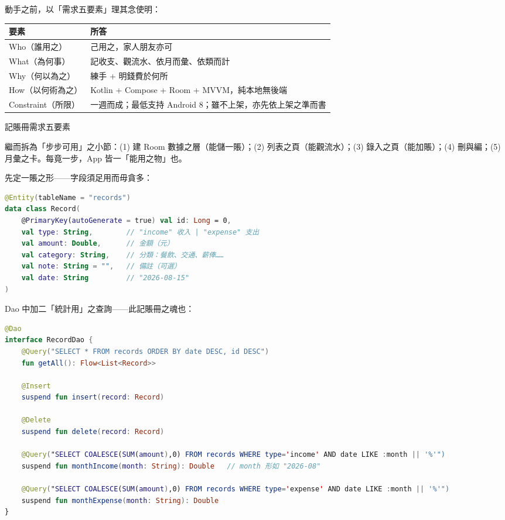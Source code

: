 


動手之前，以「需求五要素」理其念使明：

\begin{center}
\begin{tabularx}{\linewidth}{|X|X|}
\hline
\textbf{要素} & \textbf{所答} \tabularnewline
\hline
Who（誰用之） & 己用之，家人朋友亦可 \tabularnewline
What（為何事） & 記收支、觀流水、依月而彙、依類而計 \tabularnewline
Why（何以為之） & 練手 + 明錢費於何所 \tabularnewline
How（以何術為之） & Kotlin + Compose + Room + MVVM，純本地無後端 \tabularnewline
Constraint（所限） & 一週而成；最低支持 Android 8；雖不上架，亦先依上架之準而書 \tabularnewline
\hline
\end{tabularx}
\end{center}

\begin{center}\small\color{gray}記賬冊需求五要素\end{center}

繼而拆為「步步可用」之小節：(1) 建 Room 數據之層（能儲一賬）；(2) 列表之頁（能觀流水）；(3) 錄入之頁（能加賬）；(4) 刪與編；(5) 月彙之卡。每竟一步，App 皆一「能用之物」也。


先定一賬之形——字段須足用而毋貪多：

\begin{lstlisting}[language=Kotlin]
@Entity(tableName = "records")
data class Record(
    @PrimaryKey(autoGenerate = true) val id: Long = 0,
    val type: String,        // "income" 收入 | "expense" 支出
    val amount: Double,      // 金額（元）
    val category: String,    // 分類：餐飲、交通、薪俸……
    val note: String = "",   // 備註（可選）
    val date: String         // "2026-08-15"
)
\end{lstlisting}

Dao 中加二「統計用」之查詢——此記賬冊之魂也：

\begin{lstlisting}[language=Kotlin]
@Dao
interface RecordDao {
    @Query("SELECT * FROM records ORDER BY date DESC, id DESC")
    fun getAll(): Flow<List<Record>>

    @Insert
    suspend fun insert(record: Record)

    @Delete
    suspend fun delete(record: Record)

    @Query("SELECT COALESCE(SUM(amount),0) FROM records WHERE type='income' AND date LIKE :month || '%'")
    suspend fun monthIncome(month: String): Double   // month 形如 "2026-08"

    @Query("SELECT COALESCE(SUM(amount),0) FROM records WHERE type='expense' AND date LIKE :month || '%'")
    suspend fun monthExpense(month: String): Double
}
\end{lstlisting}

